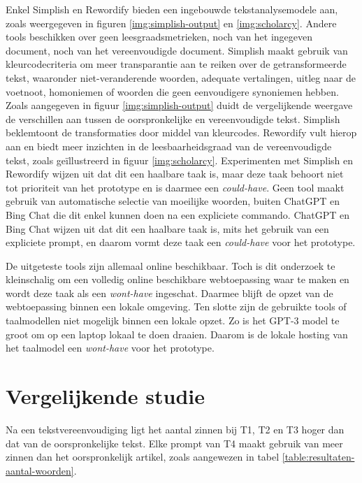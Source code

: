 \medspace

Enkel Simplish en Rewordify bieden een ingebouwde tekstanalysemodele aan, zoals weergegeven in figuren \ref{img:simplish-output} en \ref{img:scholarcy}. Andere tools beschikken over geen leesgraadsmetrieken, noch van het ingegeven document, noch van het vereenvoudigde document. Simplish maakt gebruik van kleurcodecriteria om meer transparantie aan te reiken over de getransformeerde tekst, waaronder niet-veranderende woorden, adequate vertalingen, uitleg naar de voetnoot, homoniemen of woorden die geen eenvoudigere synoniemen hebben. Zoals aangegeven in figuur \ref{img:simplish-output} duidt de vergelijkende weergave de verschillen aan tussen de oorspronkelijke en vereenvoudigde tekst. Simplish beklemtoont de transformaties door middel van kleurcodes. Rewordify vult hierop aan en biedt meer inzichten in de leesbaarheidsgraad van de vereenvoudigde tekst, zoals geïllustreerd in figuur \ref{img:scholarcy}. Experimenten met Simplish en Rewordify wijzen uit dat dit een haalbare taak is, maar deze taak behoort niet tot prioriteit van het prototype en is daarmee een \textit{could-have}. Geen tool maakt gebruik van automatische selectie van moeilijke woorden, buiten ChatGPT en Bing Chat die dit enkel kunnen doen na een expliciete commando. ChatGPT en Bing Chat wijzen uit dat dit een haalbare taak is, mits het gebruik van een expliciete prompt, en daarom vormt deze taak een \textit{could-have} voor het prototype.

\medspace

De uitgeteste tools zijn allemaal online beschikbaar. Toch is dit onderzoek te kleinschalig om een volledig online beschikbare webtoepassing waar te maken en wordt deze taak als een \textit{wont-have} ingeschat. Daarmee blijft de opzet van de webtoepassing binnen een lokale omgeving. Ten slotte zijn de gebruikte tools of taalmodellen niet mogelijk binnen een lokale opzet. Zo is het GPT-3 model te groot om op een laptop lokaal te doen draaien. Daarom is de lokale hosting van het taalmodel een \textit{wont-have} voor het prototype. 

\section{Vergelijkende studie}

Na een tekstvereenvoudiging ligt het aantal zinnen bij T1, T2 en T3 hoger dan dat van de oorspronkelijke tekst. Elke prompt van T4 maakt gebruik van meer zinnen dan het oorspronkelijk artikel, zoals aangewezen in tabel \ref{table:resultaten-aantal-woorden}.

